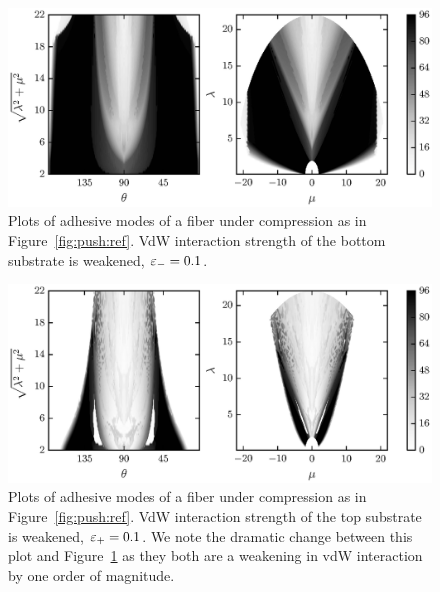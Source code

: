 {	\begin{figure}[t]
		\begin{center}
			\includegraphics{./fig/ch3/push/eb0.1/grid.eps}
		\end{center}		
		\caption{Plots of adhesive modes of a fiber under compression as in Figure~\ref{fig:push:ref}. VdW interaction strength of the bottom substrate is weakened, $\varepsilon_-=0.1$.
		\label{fig:push:eb0.1}}
	\end{figure}	

	\begin{figure}[t]
		\begin{center}
			\includegraphics{./fig/ch3/push/et0.1/grid.eps}
		\end{center}		
		\caption{Plots of adhesive modes of a fiber under compression as in Figure~\ref{fig:push:ref}. VdW interaction strength of the top substrate is weakened, $\varepsilon_+=0.1$. We note the dramatic change between this plot and Figure~\ref{fig:push:eb0.1} as they both are a weakening in vdW interaction by one order of magnitude.
		\label{fig:push:et0.1}}
	\end{figure}

}
